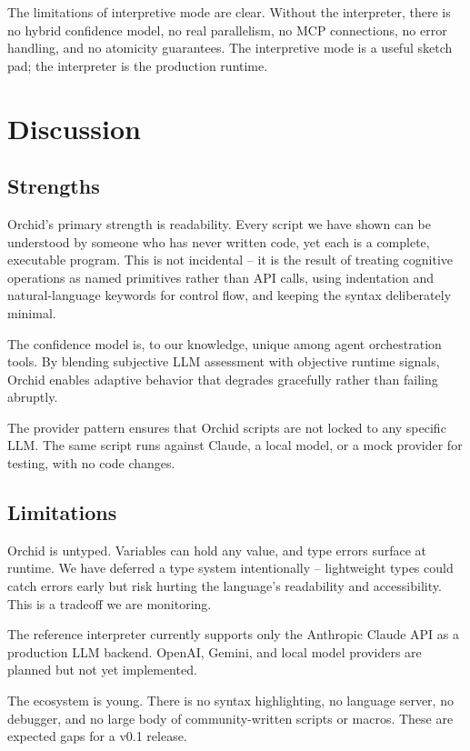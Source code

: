 \documentclass[11pt,a4paper]{article}
\begin{document}
The limitations of interpretive mode are clear. Without the interpreter, there is no hybrid confidence model, no real parallelism, no MCP connections, no error handling, and no atomicity guarantees. The interpretive mode is a useful sketch pad; the interpreter is the production runtime.

\section{Discussion}

\subsection{Strengths}

Orchid's primary strength is readability. Every script we have shown can be understood by someone who has never written code, yet each is a complete, executable program. This is not incidental -- it is the result of treating cognitive operations as named primitives rather than API calls, using indentation and natural-language keywords for control flow, and keeping the syntax deliberately minimal.

The confidence model is, to our knowledge, unique among agent orchestration tools. By blending subjective LLM assessment with objective runtime signals, Orchid enables adaptive behavior that degrades gracefully rather than failing abruptly.

The provider pattern ensures that Orchid scripts are not locked to any specific LLM. The same script runs against Claude, a local model, or a mock provider for testing, with no code changes.

\subsection{Limitations}

Orchid is untyped. Variables can hold any value, and type errors surface at runtime. We have deferred a type system intentionally -- lightweight types could catch errors early but risk hurting the language's readability and accessibility. This is a tradeoff we are monitoring.

The reference interpreter currently supports only the Anthropic Claude API as a production LLM backend. OpenAI, Gemini, and local model providers are planned but not yet implemented.

The ecosystem is young. There is no syntax highlighting, no language server, no debugger, and no large body of community-written scripts or macros. These are expected gaps for a v0.1 release.
\end{document}
